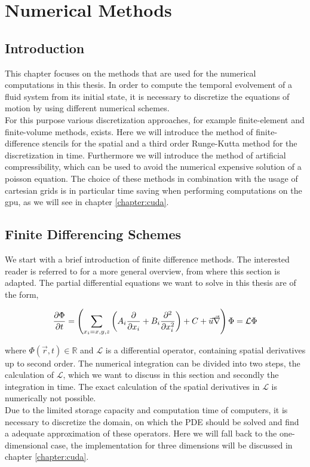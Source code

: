 \chapter{Numerical Methods}

\section{Introduction}

This chapter focuses on the methods that are used for the numerical computations in this thesis.
In order to compute the temporal evolvement of a fluid system from its initial state, it is necessary to discretize
the equations of motion by using different numerical schemes.\\
For this purpose various discretization approaches, for example finite-element and finite-volume methods, exists.
Here we will introduce the method of finite-difference stencils for the spatial and a third order Runge-Kutta method for the discretization in time.
Furthermore we will introduce the method of artificial compressibility, which can be used to avoid the numerical expensive solution of a poisson equation.
The choice of these methods in combination with the usage of cartesian grids is in particular time saving when performing computations on the gpu, as we
will see in chapter \ref{chapter:cuda}.

\section{Finite Differencing Schemes}

We start with a brief introduction of finite difference methods.
The interested reader is referred to \citep{ferziger99} for a more general overview, from where this section is adapted.
The partial differential equations we want to solve in this thesis are of the form,

\begin{align}
    \label{numerik:pde_allg}
    \pdn[\Phi]{t} = \left(\sum_{x_i=x,y,z}\left( A_i \pdn[]{x_i}  + B_i \pdn[^2]{x_i^2}\right) + C +  \vec{u}\vec{\nabla} \right) \Phi = \mathcal{L} \Phi
\end{align}

where $\Phi(\vec{r}, t)\in\mathbb{R}$ and $\mathcal{L}$ is a differential operator, containing spatial derivatives up to second order.
The numerical integration can be divided into two steps, the calculation of $\mathcal{L}$, which we want to discuss in this
section and secondly the integration in time.
The exact calculation of the spatial derivatives in $\mathcal{L}$ is numerically not possible.\\
Due to the limited storage capacity and computation time of computers,
it is necessary to discretize the domain, on which the PDE should be solved and find a adequate approximation of these operators.
Here we will fall back to the  one-dimensional case, the implementation for three dimensions will be discussed in chapter \ref{chapter:cuda}.\\


